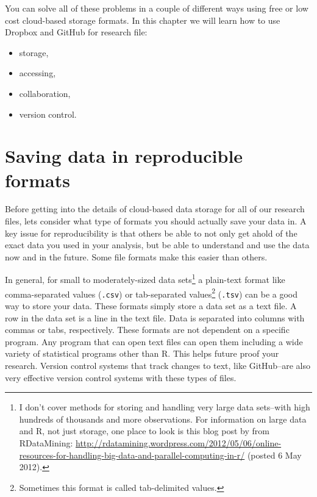 You can solve all of these problems in a couple of different ways using free or low cost cloud-based storage formats. In this chapter we will learn how to use Dropbox and GitHub for research file:

\begin{itemize}
    \item storage,
    \item accessing,
    \item collaboration,
    \item version control.
\end{itemize}

\section{Saving data in reproducible formats}

Before getting into the details of cloud-based data storage for all of our research files, lets consider what type of formats you should actually save your data in. A key issue for reproducibility is that others be able to not only get ahold of the exact data you used in your analysis, but be able to understand and use the data now and in the future. Some file formats make this easier than others.

In general, for small to moderately-sized data sets\footnote{I don't cover methods for storing and handling very large data sets--with high hundreds of thousands and more observations. For information on large data and R, not just storage, one place to look is this blog post by from RDataMining: \url{http://rdatamining.wordpress.com/2012/05/06/online-resources-for-handling-big-data-and-parallel-computing-in-r/} (posted 6 May 2012).} a plain-text format like comma-separated values (\texttt{.csv}) or tab-separated values\footnote{Sometimes this format is called tab-delimited values.} (\texttt{.tsv}) can be a good way to store your data. These formats simply store a data set as a text file. A row in the data set is a line in the text file. Data is separated into columns with commas or tabs, respectively. These formats are not dependent on a specific program. Any program that can open text files can open them including a wide variety of statistical programs other than R. This helps future proof your research. Version control systems that track changes to text, like GitHub--are also very effective version control systems with these types of files. 


